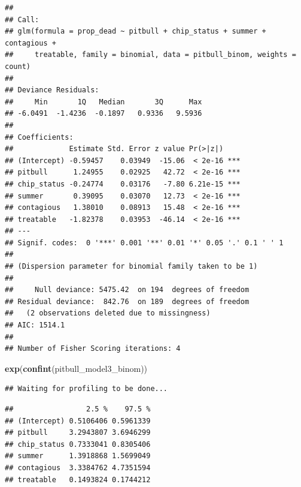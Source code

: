 \documentclass[]{article}
\newenvironment{Shaded}{\begin{snugshade}}{\end{snugshade}}
\newcommand{\KeywordTok}[1]{\textcolor[rgb]{0.13,0.29,0.53}{\textbf{#1}}}
\newcommand{\DataTypeTok}[1]{\textcolor[rgb]{0.13,0.29,0.53}{#1}}
\newcommand{\StringTok}[1]{\textcolor[rgb]{0.31,0.60,0.02}{#1}}
\newcommand{\OperatorTok}[1]{\textcolor[rgb]{0.81,0.36,0.00}{\textbf{#1}}}
\newcommand{\NormalTok}[1]{#1}
\begin{document}
\begin{Shaded}
\begin{Highlighting}[]
{{{{{{{\NormalTok{pitbull_model3_quasi <-}\StringTok{ }\KeywordTok{glm}\NormalTok{(prop_dead }\OperatorTok{~}\StringTok{ }\NormalTok{pitbull }\OperatorTok{+}\StringTok{ }\NormalTok{chip_status }\OperatorTok{+}
\StringTok{                      }\NormalTok{summer }\OperatorTok{+}\StringTok{ }\NormalTok{contagious }\OperatorTok{+}\StringTok{ }\NormalTok{treatable,}
                      \DataTypeTok{weights =}\NormalTok{ count,}
                      \DataTypeTok{family =}\NormalTok{ quasibinomial, }\DataTypeTok{data =}\NormalTok{ pitbull_binom)}

\KeywordTok{summary}\NormalTok{(pitbull_model3_binom)}
\end{Highlighting}
\end{Shaded}

\begin{verbatim}
## 
## Call:
## glm(formula = prop_dead ~ pitbull + chip_status + summer + contagious + 
##     treatable, family = binomial, data = pitbull_binom, weights = count)
## 
## Deviance Residuals: 
##     Min       1Q   Median       3Q      Max  
## -6.0491  -1.4236  -0.1897   0.9336   9.5936  
## 
## Coefficients:
##             Estimate Std. Error z value Pr(>|z|)    
## (Intercept) -0.59457    0.03949  -15.06  < 2e-16 ***
## pitbull      1.24955    0.02925   42.72  < 2e-16 ***
## chip_status -0.24774    0.03176   -7.80 6.21e-15 ***
## summer       0.39095    0.03070   12.73  < 2e-16 ***
## contagious   1.38010    0.08913   15.48  < 2e-16 ***
## treatable   -1.82378    0.03953  -46.14  < 2e-16 ***
## ---
## Signif. codes:  0 '***' 0.001 '**' 0.01 '*' 0.05 '.' 0.1 ' ' 1
## 
## (Dispersion parameter for binomial family taken to be 1)
## 
##     Null deviance: 5475.42  on 194  degrees of freedom
## Residual deviance:  842.76  on 189  degrees of freedom
##   (2 observations deleted due to missingness)
## AIC: 1514.1
## 
## Number of Fisher Scoring iterations: 4
\end{verbatim}

\begin{Shaded}
\begin{Highlighting}[]
\KeywordTok{exp}\NormalTok{(}\KeywordTok{confint}\NormalTok{(pitbull_model3_binom))}
\end{Highlighting}
\end{Shaded}

\begin{verbatim}
## Waiting for profiling to be done...
\end{verbatim}

\begin{verbatim}
##                 2.5 %    97.5 %
## (Intercept) 0.5106406 0.5961339
## pitbull     3.2943807 3.6946299
## chip_status 0.7333041 0.8305406
## summer      1.3918868 1.5699049
## contagious  3.3384762 4.7351594
## treatable   0.1493824 0.1744212
\end{verbatim}
\end{document}

